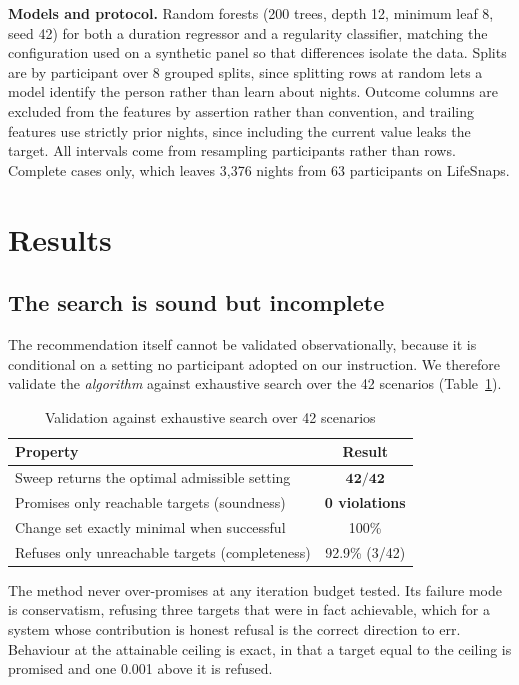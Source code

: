 \documentclass[conference]{IEEEtran}
\begin{document}
\textbf{Models and protocol.} Random forests (200 trees, depth 12, minimum leaf
8, seed 42) for both a duration regressor and a regularity classifier, matching
the configuration used on a synthetic panel so that differences isolate the
data. Splits are by participant over 8 grouped splits, since splitting rows at
random lets a model identify the person rather than learn about nights. Outcome
columns are excluded from the features by assertion rather than convention, and
trailing features use strictly prior nights, since including the current value
leaks the target. All intervals come from resampling participants rather than
rows. Complete cases only, which leaves 3,376 nights from 63 participants on
LifeSnaps.

\section{Results}
\label{sec:results}

\subsection{The search is sound but incomplete}
\label{sec:sound}

The recommendation itself cannot be validated observationally, because it is
conditional on a setting no participant adopted on our instruction. We therefore
validate the \emph{algorithm} against exhaustive search over the 42 scenarios
(Table~\ref{tab:sound}).

\begin{table}[t]
\caption{Validation against exhaustive search over 42 scenarios}
\label{tab:sound}
\centering
\small
\begin{tabular}{lc}
\toprule
Property & Result \\
\midrule
Sweep returns the optimal admissible setting & $\mathbf{42/42}$ \\
Promises only reachable targets (soundness) & \textbf{0 violations} \\
Change set exactly minimal when successful & 100\% \\
Refuses only unreachable targets (completeness) & 92.9\% (3/42) \\
\bottomrule
\end{tabular}
\end{table}

The method never over-promises at any iteration budget tested. Its failure mode
is conservatism, refusing three targets that were in fact achievable, which for
a system whose contribution is honest refusal is the correct direction to err.
Behaviour at the attainable ceiling is exact, in that a target equal to the
ceiling is promised and one 0.001 above it is refused.
\end{document}

